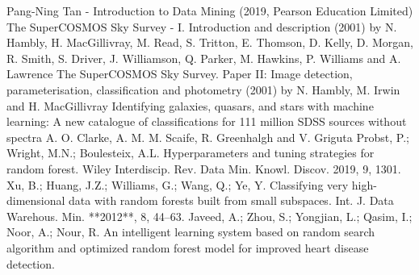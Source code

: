 \documentclass[a4paper,12pt]{article}
\begin{document}
\newpage
\begin{thebibliography}{Literatura}
\bibitem{} Pang-Ning Tan - Introduction to Data Mining (2019, Pearson Education Limited)
\bibitem{} The SuperCOSMOS Sky Survey - I. Introduction and description (2001) by N. Hambly, H. MacGillivray, M. Read, S. Tritton, E. Thomson, D. Kelly, D. Morgan, R. Smith, S. Driver, J. Williamson, Q. Parker, M. Hawkins, P. Williams and A. Lawrence
\bibitem{} The SuperCOSMOS Sky Survey. Paper II: Image detection, parameterisation, classification and photometry (2001) by N. Hambly, M. Irwin and H. MacGillivray
\bibitem{} Identifying galaxies, quasars, and stars with machine learning: A new catalogue of classifications for 111 million SDSS sources without spectra A. O. Clarke, A. M. M. Scaife, R. Greenhalgh and V. Griguta
\bibitem{} Probst, P.; Wright, M.N.; Boulesteix, A.L. Hyperparameters and tuning strategies for random forest. Wiley Interdiscip. Rev. Data Min. Knowl. Discov. 2019, 9, 1301.
\bibitem{} Xu, B.; Huang, J.Z.; Williams, G.; Wang, Q.; Ye, Y. Classifying very high-dimensional data with random forests built from small subspaces. Int. J. Data Warehous. Min. **2012**, 8, 44–63.
\bibitem{} Javeed, A.; Zhou, S.; Yongjian, L.; Qasim, I.; Noor, A.; Nour, R. An intelligent learning system based on random search algorithm and optimized random forest model for improved heart disease detection.
\end{thebibliography}
\end{document}
